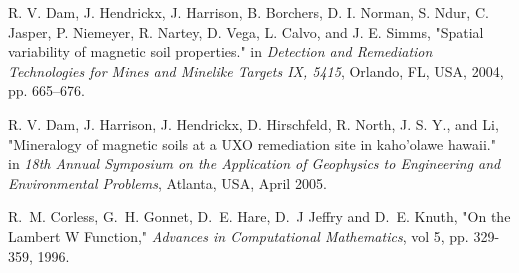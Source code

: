 \documentclass[journal]{IEEEtran}  %
\begin{document}
\begin{thebibliography}{100}
R. V. Dam, J. Hendrickx, J. Harrison, B. Borchers, D. I. Norman, S. Ndur, C. Jasper, P. Niemeyer, R. Nartey, D. Vega, L. Calvo, and J. E. Simms, "Spatial variability of magnetic soil properties." in \emph{Detection and Remediation Technologies for Mines and Minelike Targets IX, 5415}, Orlando, FL, USA, 2004, pp. 665–676.

R. V. Dam, J. Harrison, J. Hendrickx, D. Hirschfeld, R. North, J. S. Y., and Li, "Mineralogy of magnetic soils at a UXO remediation site in kaho’olawe hawaii." in \emph{18th Annual Symposium on the Application of Geophysics to Engineering and Environmental Problems}, Atlanta, USA, April 2005. 


R.~M. Corless, G.~H. Gonnet, D.~E. Hare, D.~J Jeffry and D.~E. Knuth, "On the Lambert W Function," \emph{Advances in Computational Mathematics}, vol 5, pp. 329-359, 1996.










\end{thebibliography}











%
%
\end{document}
